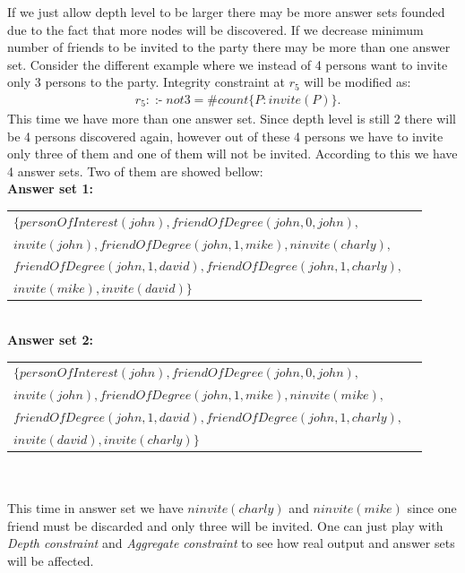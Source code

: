 \documentclass[14pt,a4paper, titlepage]{article}
\DeclareMathOperator{\leftimpl}{:-}
\begin{document}
If we just allow depth level to be larger there may be more 
answer sets founded due to the fact that more nodes will be 
discovered. If we decrease minimum number of friends to be 
invited to the party there may be more than one answer set. 
Consider the different example where we instead of 4 
persons want to invite only 3 persons to the party. 
Integrity constraint at $r_5$ will be modified as:
\begin{align*}
& r_5 \colon \leftimpl \mathit{ not } \mathit{ 3 } 
=\mathit{\#count} \{ P : \mathit{invite(P)} \}.
\end{align*} 
 This time we have more than one answer set. Since depth 
 level is still 2 there will be 4 persons discovered again, 
 however out of these 4 persons we have to invite only 
 three of them and one of them will not be invited. 
 According to this we have 4 answer sets. Two of them are 
 showed bellow:\\
\textbf{Answer set 1:}\\
\begin{tabular}{ l r }
   $\mathit{\{personOfInterest(john), 
   friendOfDegree(john,0,john),}$& \\
   $\mathit{invite(john), friendOfDegree(john,1,mike), 
   \mathit{ninvite(charly)},}$& \\
   $\mathit{friendOfDegree(john,1,david), 
   friendOfDegree(john,1,charly),}$ & \\
   $\mathit{invite(mike),invite(david)\}}$
 \end{tabular}
\\ \textbf{Answer set 2:}\\
 \begin{tabular}{ l r }
   $\mathit{\{personOfInterest(john), 
   friendOfDegree(john,0,john),}$& \\
   $\mathit{invite(john), friendOfDegree(john,1,mike), 
   \mathit{ninvite(mike)},}$& \\
   $\mathit{friendOfDegree(john,1,david), 
   friendOfDegree(john,1,charly),}$ & \\
   $\mathit{invite(david),invite(charly)\}}$
 \end{tabular}
\\ \\ This time in answer set we have 
$\mathit{ninvite(charly)}$ and $\mathit{ninvite(mike)}$ 
since one friend must be discarded and only three will be 
invited. One can just play with \emph{Depth constraint} and 
\emph{Aggregate constraint} to see how real output and 
answer sets will be affected.    
\end{document}
